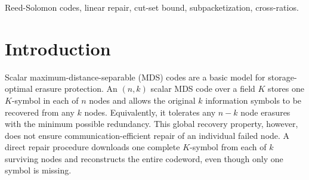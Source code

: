 \documentclass[11pt,onecolumn]{IEEEtran}
\newcommand{\lcmop}{\operatorname{lcm}}
\newcommand{\ellmin}{\ell_{\min}}
\begin{document}
\begin{abstract}
In this paper, we study the minimum subpacketization of $(n,k)$
Reed-Solomon (RS) codes over $\mathbb{F}_{q^\ell}$
admitting cut-set-optimal exact $\mathbb{F}_q$-linear
repair of every coordinate from any $d$ helpers.
For $3\le k<d\le n-1$, write $s=d+1-k$ and
denote this minimum by $\ellmin(n,k,d;q)$.
Using divisibility and relative-degree constraints
on cross-ratio fields of evaluation sets, we
establish $\ellmin(n,k,d;q)\ge sG_s(d+1)$, where
$G_s(m)$ is the minimum product of $m$ pairwise
coprime integers, each at least $s$.
Let $\Delta_s(n,d)$ be the minimum of
$\lcmop(a_1,\ldots,a_n)$ over positive integers
$a_1,\ldots,a_n$ satisfying
$\lcmop(a_j:j\in J\cup\{i\})\ge
s\lcmop(a_j:j\in J)$ for every $d$-subset
$J\subseteq[n]$ and every $i\in[n]\setminus J$.
We construct RS codes with subpacketization
$s\Delta_s(n,d)$ and further prove that
$\ellmin(n,k,d;q)=s\Delta_s(n,d)=sG_s(n)$ whenever
$d(d+2)\geq 4(n+1)$, for every prime power $q$.
In particular, this determines the minimum subpacketization in the full-helper case $d=n-1$, resolving the corresponding exact linear-repair case of Open Problem 20 posed by Ramkumar et al. in their survey
on codes for distributed storage. 
We further give a finite formula for $G_s(n)$
and determine the exact threshold for its
closed-form expression in terms of the first
$n$ primes.
For fixed $k$ and $d$, we prove
$\log\ellmin(n,k,d;q)=
\Theta_{k,d}(\log n\log\log n)$ as
$n\to\infty$, using divisor-function estimates
and cover-free families.
An affine-plane construction shows that
$\Delta_s(n,d)<G_s(n)$ for some parameters,
so $sG_s(n)$ is not a universal formula.
We conjecture that
$\ellmin(n,k,d;q)=s\Delta_s(n,d)$
for every prime power $q$ and all
$3\le k<d\le n-1$.
\end{abstract}





\begin{IEEEkeywords}
Reed-Solomon codes, linear repair, cut-set bound,
subpacketization, cross-ratios.
\end{IEEEkeywords}

\section{Introduction}

Scalar maximum-distance-separable (MDS) codes are a basic model for
storage-optimal erasure protection.  An $(n,k)$ scalar MDS code over a
field $K$ stores one $K$-symbol in each of $n$ nodes and allows the
original $k$ information symbols to be recovered from any $k$ nodes.
Equivalently, it tolerates any $n-k$ node erasures with the minimum
possible redundancy.  This global recovery property, however, does not
ensure communication-efficient repair of an individual failed node.
A direct repair procedure downloads one complete $K$-symbol from each
of $k$ surviving nodes and reconstructs the entire codeword, even
though only one symbol is missing.
\end{document}
